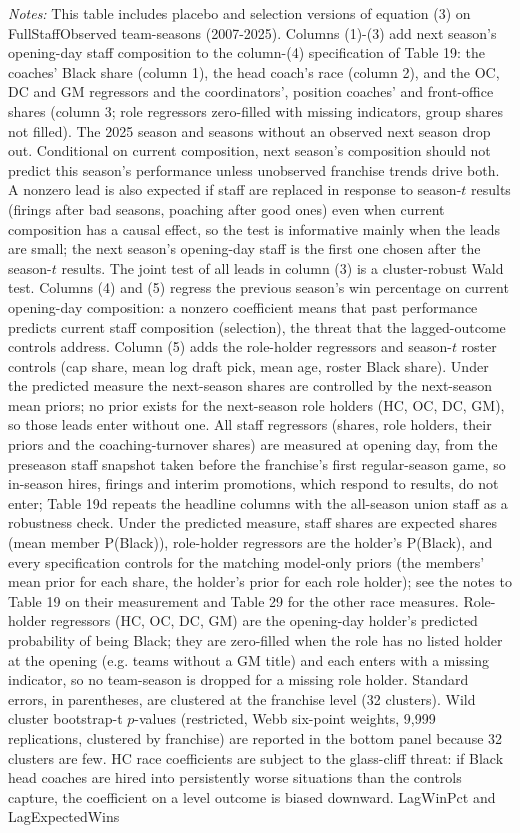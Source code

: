 {\footnotesize
\noindent\textit{Notes:} This table includes placebo and selection versions of equation (3) on FullStaffObserved team-seasons (2007-2025). Columns (1)-(3) add next season's opening-day staff composition to the column-(4) specification of Table 19: the coaches' Black share (column 1), the head coach's race (column 2), and the OC, DC and GM regressors and the coordinators', position coaches' and front-office shares (column 3; role regressors zero-filled with missing indicators, group shares not filled). The 2025 season and seasons without an observed next season drop out. Conditional on current composition, next season's composition should not predict this season's performance unless unobserved franchise trends drive both. A nonzero lead is also expected if staff are replaced in response to season-$t$ results (firings after bad seasons, poaching after good ones) even when current composition has a causal effect, so the test is informative mainly when the leads are small; the next season's opening-day staff is the first one chosen after the season-$t$ results. The joint test of all leads in column (3) is a cluster-robust Wald test. Columns (4) and (5) regress the previous season's win percentage on current opening-day composition: a nonzero coefficient means that past performance predicts current staff composition (selection), the threat that the lagged-outcome controls address. Column (5) adds the role-holder regressors and season-$t$ roster controls (cap share, mean log draft pick, mean age, roster Black share). Under the predicted measure the next-season shares are controlled by the next-season mean priors; no prior exists for the next-season role holders (HC, OC, DC, GM), so those leads enter without one. All staff regressors (shares, role holders, their priors and the coaching-turnover shares) are measured at opening day, from the preseason staff snapshot taken before the franchise's first regular-season game, so in-season hires, firings and interim promotions, which respond to results, do not enter; Table 19d repeats the headline columns with the all-season union staff as a robustness check. Under the predicted measure, staff shares are expected shares (mean member P(Black)), role-holder regressors are the holder's P(Black), and every specification controls for the matching model-only priors (the members' mean prior for each share, the holder's prior for each role holder); see the notes to Table 19 on their measurement and Table 29 for the other race measures. Role-holder regressors (HC, OC, DC, GM) are the opening-day holder's predicted probability of being Black; they are zero-filled when the role has no listed holder at the opening (e.g. teams without a GM title) and each enters with a missing indicator, so no team-season is dropped for a missing role holder. Standard errors, in parentheses, are clustered at the franchise level (32 clusters). Wild cluster bootstrap-t $p$-values (restricted, Webb six-point weights, 9,999 replications, clustered by franchise) are reported in the bottom panel because 32 clusters are few. HC race coefficients are subject to the glass-cliff threat: if Black head coaches are hired into persistently worse situations than the controls capture, the coefficient on a level outcome is biased downward. LagWinPct and LagExpectedWins }

